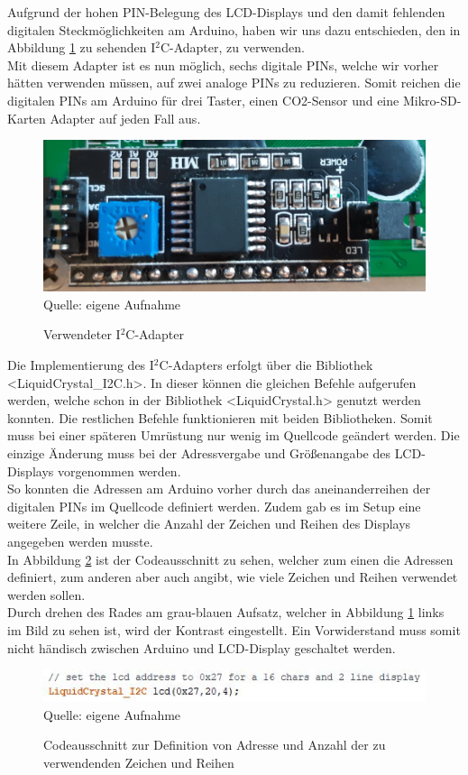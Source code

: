 \label{I2CAdapter}

Aufgrund der hohen PIN-Belegung des \ac{LCD}-Displays und den damit fehlenden digitalen Steckmöglichkeiten am Arduino, haben wir uns dazu entschieden, den in Abbildung \ref{fig:I2CAdapter} zu sehenden I$^2$C-Adapter, zu verwenden. \\
Mit diesem Adapter ist es nun möglich, sechs digitale PINs, welche wir vorher hätten verwenden müssen, auf zwei analoge PINs zu reduzieren. Somit reichen die digitalen PINs am Arduino für drei Taster, einen CO2-Sensor und eine Mikro-SD-Karten Adapter auf jeden Fall aus.

\begin{figure}[!hbt]
	\centering
	\includegraphics[width=0.5\linewidth]{Images/I2CAdapter}
	\footnotesize \\Quelle: eigene Aufnahme
	\caption{Verwendeter I$^2$C-Adapter}
	\label{fig:I2CAdapter}
\end{figure}

Die Implementierung des I$^2$C-Adapters erfolgt über die Bibliothek <LiquidCrystal\_I2C.h>. In dieser können die gleichen Befehle aufgerufen werden, welche schon in der Bibliothek <LiquidCrystal.h> genutzt werden konnten. Die restlichen Befehle funktionieren mit beiden Bibliotheken. Somit muss bei einer späteren Umrüstung nur wenig im Quellcode geändert werden. Die einzige Änderung muss bei der Adressvergabe und Größenangabe des \ac{LCD}-Displays vorgenommen werden. \\
So konnten die Adressen am Arduino vorher durch das aneinanderreihen der digitalen PINs im Quellcode definiert werden. Zudem gab es im Setup eine weitere Zeile, in welcher die Anzahl der Zeichen und Reihen des Displays angegeben werden musste. \\
In Abbildung \ref{fig:I2CAdressen} ist der Codeausschnitt zu sehen, welcher zum einen die Adressen definiert, zum anderen aber auch angibt, wie viele Zeichen und Reihen verwendet werden sollen. \\
Durch drehen des Rades am grau-blauen Aufsatz, welcher in Abbildung \ref{fig:I2CAdapter} links im Bild zu sehen ist, wird der Kontrast eingestellt. Ein Vorwiderstand muss somit nicht händisch zwischen Arduino und \ac{LCD}-Display geschaltet werden.

\begin{figure}[!hbt]
	\centering
	\includegraphics[width=0.6\linewidth]{Images/I2CAdressen}
	\footnotesize \\Quelle: eigene Aufnahme
	\caption{Codeausschnitt zur Definition von Adresse und Anzahl der zu verwendenden Zeichen und Reihen}
	\label{fig:I2CAdressen}
\end{figure}
